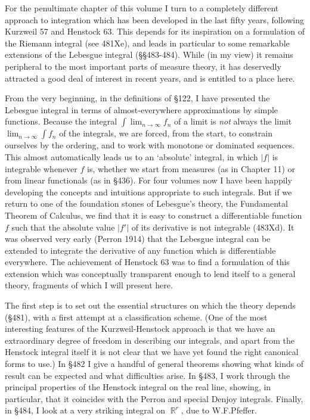  
\def\chaptername{Gauge integrals} 
\def\sectionname{Introduction} 
 
 
For the penultimate chapter of this volume I turn to a completely different 
approach to integration which has been developed in the last fifty 
years, following {\smc Kurzweil 57} and {\smc Henstock 63}.   This 
depends for its inspiration on a formulation of the Riemann 
integral (see 481Xe), and leads in particular to some remarkable 
extensions of the Lebesgue integral (\S\S483-484).   While (in my view) 
it remains peripheral to the most important parts of measure theory, it 
has deservedly attracted a good deal of interest in recent years, and is 
entitled to a place here. 
 
From the very beginning, in the definitions of \S122, I have presented 
the Lebesgue integral in terms of almost-everywhere approximations by 
simple functions.   Because the integral $\int\lim_{n\to\infty}f_n$ of a 
limit is {\it not} always the limit $\lim_{n\to\infty}\int f_n$ of the 
integrals, we are forced, from the start, to constrain ourselves by 
the ordering, and to work with monotone or dominated sequences.   This 
almost automatically leads us to an `absolute' integral, in which $|f|$ 
is integrable whenever $f$ is, whether we start from measures (as in 
Chapter 11) or from linear functionals (as in \S436).   For four volumes 
now I have been happily developing the concepts and intuitions 
appropriate to such integrals.   But if we return to one of the 
foundation stones of Lebesgue's theory, the Fundamental Theorem of 
Calculus, we find that it is easy to construct a differentiable 
function $f$ such that the absolute value $|f'|$ of its derivative is 
not integrable (483Xd).   It was observed very early ({\smc Perron 1914}) 
that the Lebesgue integral can be extended to integrate the derivative 
of any function which is differentiable everywhere.   The achievement of 
{\smc Henstock 63} was to find a formulation of this extension which was 
conceptually transparent enough to lend itself to a general theory, 
fragments of which I will present here. 
 
The first step is to set out the essential structures on which the 
theory depends (\S481), with a first attempt at a classification scheme. 
(One of the most interesting features of the Kurzweil-Henstock approach 
is that we have an extraordinary degree of freedom in describing our 
integrals, and apart from the Henstock integral itself it is not clear 
that we have yet found the right canonical forms to use.)   In \S482 I 
give a handful of general theorems showing what kinds of result can be 
expected and what difficulties arise.   In \S483, I work through the 
principal properties of the Henstock integral on the real line, showing, 
in particular, that it coincides with the Perron and special Denjoy 
integrals.   Finally, in \S484, I look at a very striking 
integral on $\BbbR^r$, due to W.F.Pfeffer. 
 
\discrpage 
 
